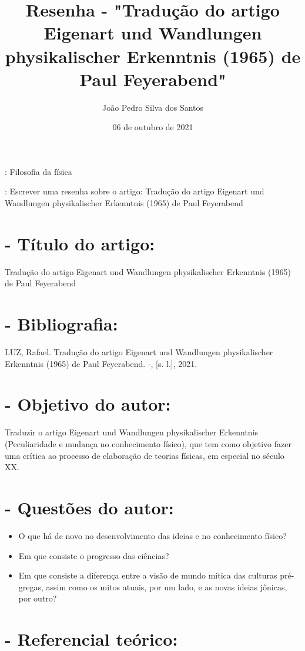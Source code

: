 \documentclass [a4paper, 12pt]{article}
\title{Resenha - "Tradução do artigo Eigenart und Wandlungen physikalischer Erkenntnis (1965) de Paul Feyerabend"}
\author{João Pedro Silva dos Santos}
\date{06 de outubro de 2021}
\begin{document}
\maketitle

{}: Filosofia da física

{}: Escrever uma resenha sobre o artigo: Tradução do artigo Eigenart und Wandlungen physikalischer Erkenntnis (1965) de Paul Feyerabend

\section*{- Título do artigo:}

Tradução do artigo Eigenart und Wandlungen physikalischer Erkenntnis (1965) de Paul Feyerabend

\section*{-  Bibliografia:}

LUZ, Rafael. Tradução do artigo Eigenart und Wandlungen physikalischer Erkenntnis (1965) de Paul Feyerabend. -, [s. l.], 2021.

\section*{- Objetivo do autor:}

Traduzir o artigo  Eigenart und Wandlungen physikalischer Erkenntnis (Peculiaridade e mudança no conhecimento físico), que tem como objetivo fazer uma crítica ao processo de elaboração de teorias físicas, em especial no século XX.

\section*{- Questões do autor:}

\begin{itemize}
    \item O que há de novo no desenvolvimento das ideias e no conhecimento físico?
    \item Em que consiste o progresso das ciências?
    \item Em que consiste a diferença entre a visão de mundo mítica das culturas pré-gregas, assim como os mitos atuais, por um lado, e as novas ideias jônicas, por outro?
\end{itemize}

\section*{- Referencial teórico:}
\end{document}

